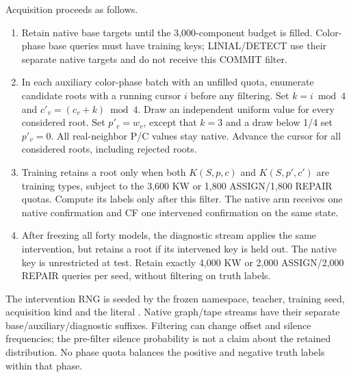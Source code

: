 Acquisition proceeds as follows.
\begin{enumerate}
\item Retain native base targets until the 3,000-component budget is filled.
Color-phase base queries must have training keys; LINIAL/DETECT use their
separate native targets and do not receive this COMMIT filter.
\item In each auxiliary color-phase batch with an unfilled quota, enumerate candidate roots with
a running cursor $i$ before any filtering. Set $k=i\bmod4$ and
$c'_v=(c_v+k)\bmod4$. Draw an independent uniform value for every considered
root. Set $p'_v=w_v$, except that $k=3$ and a draw below 1/4 set $p'_v=0$.
All real-neighbor P/C values stay native.
Advance the cursor for all considered roots, including rejected roots.
\item Training retains a root only when both $K(S,p,c)$ and $K(S,p',c')$
are training types, subject to the 3,600 KW or 1,800 ASSIGN/1,800 REPAIR
quotas. Compute its labels only after this filter. The native arm receives
one native confirmation and CF one intervened confirmation on the same state.
\item After freezing all forty models, the diagnostic stream applies the
same intervention, but retains a root if its intervened key is held out.
The native key is unrestricted at test. Retain exactly 4,000 KW or 2,000
ASSIGN/2,000 REPAIR queries per seed, without filtering on truth labels.
\end{enumerate}
The intervention RNG is seeded by the frozen namespace, teacher, training
seed, acquisition kind and the literal . Native graph/tape
streams have their separate base/auxiliary/diagnostic suffixes. Filtering can
change offset and silence frequencies; the pre-filter silence probability is
not a claim about the retained distribution. No phase quota balances the
positive and negative truth labels within that phase.

